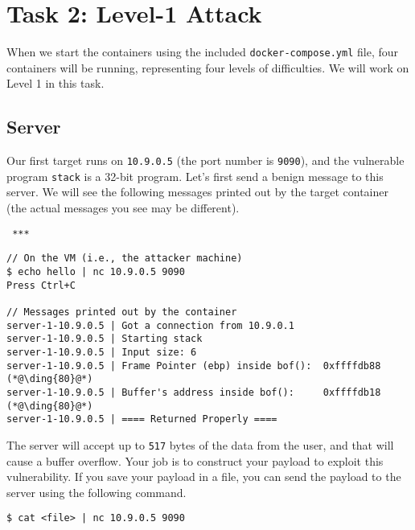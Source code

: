 
\section{Task 2: Level-1 Attack} 


When we start the containers using the included 
\texttt{docker-compose.yml} file, four containers will be 
running, representing four levels of difficulties. 
We will work on Level 1 in this task. 


\subsection{Server} 

Our first target runs on \texttt{10.9.0.5} (the port 
number is \texttt{9090}), and the vulnerable program \texttt{stack}
is a 32-bit program. 
Let's first send a benign message to this server.
We will see the following messages printed out by the target container (the
actual messages you see may be different).

\ifdefined\arm
\begin{lstlisting}
 ***
\end{lstlisting}

\else
\begin{lstlisting}
// On the VM (i.e., the attacker machine)
$ echo hello | nc 10.9.0.5 9090
Press Ctrl+C

// Messages printed out by the container
server-1-10.9.0.5 | Got a connection from 10.9.0.1
server-1-10.9.0.5 | Starting stack
server-1-10.9.0.5 | Input size: 6
server-1-10.9.0.5 | Frame Pointer (ebp) inside bof():  0xffffdb88    (*@\ding{80}@*)
server-1-10.9.0.5 | Buffer's address inside bof():     0xffffdb18    (*@\ding{80}@*)
server-1-10.9.0.5 | ==== Returned Properly ====
\end{lstlisting}
\fi


The server will accept up to \texttt{517} bytes of the data from the 
user, and that will cause a buffer overflow. Your job 
is to construct your payload to exploit this vulnerability. If 
you save your payload in a file, you can send the payload
to the server using the following command.

\begin{lstlisting}
$ cat <file> | nc 10.9.0.5 9090
\end{lstlisting}

